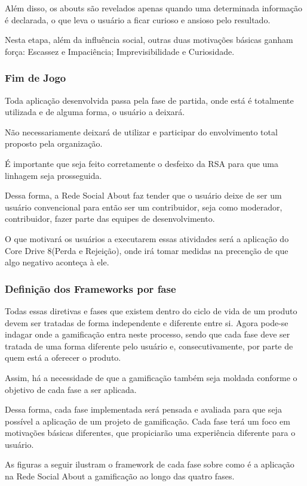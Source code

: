 Além disso, os abouts são revelados apenas quando uma determinada informação
é declarada, o que leva o usuário a ficar curioso e ansioso pelo resultado. 

Nesta etapa, além da influência social, outras duas motivações básicas ganham 
força: Escassez e Impaciência; Imprevisibilidade e Curiosidade.

\subsubsection{Fim de Jogo}
\label{sub:fim_de_jogo}
Toda aplicação desenvolvida passa pela fase de partida, onde está é totalmente utilizada
e de alguma forma, o usuário a deixará. 

Não necessariamente deixará de utilizar e participar do envolvimento total proposto pela
organização.

É importante que seja feito corretamente o desfeixo da RSA para que uma linhagem seja
prosseguida.

Dessa forma, a Rede Social About faz tender que o usuário deixe de ser um usuário
convencional para então ser um contribuidor,  seja como moderador, contribuidor,
fazer parte das equipes de desenvolvimento.

O que motivará os usuários a executarem essas atividades será a aplicação 
do Core Drive 8(Perda e Rejeição), onde  irá tomar medidas na precenção de
que algo negativo aconteça à ele.


\subsubsection{Definição dos Frameworks por fase}
\label{sub:fim_de_jogo}
Todas essas diretivas e fases que existem dentro do ciclo de vida de um produto devem ser
tratadas de forma independente e diferente entre si. Agora pode-se indagar onde a gamificação
entra neste processo, sendo que cada fase deve ser tratada de uma forma diferente pelo
usuário e, consecutivamente, por parte de quem está a oferecer o produto.

Assim, há a necessidade de que a gamificação também seja moldada conforme o objetivo de
cada fase a ser aplicada.

Dessa forma, cada fase implementada será pensada e avaliada para que seja possível a
aplicação de um  projeto de gamificação. Cada fase terá um foco em motivações
básicas diferentes, que propiciarão uma experiência diferente para o usuário.

As figuras a seguir ilustram o framework de cada fase sobre como é a aplicação na
Rede Social About a gamificação ao longo das quatro fases.

